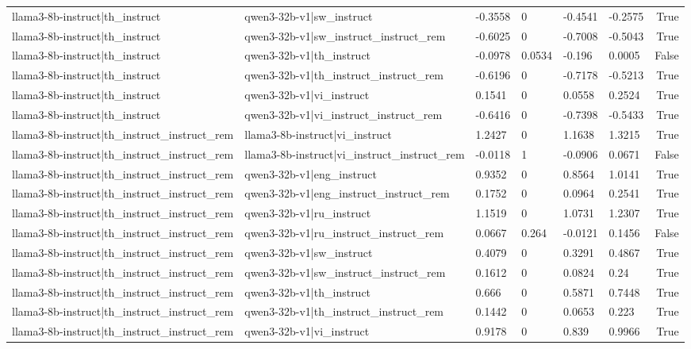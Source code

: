 \begin{table}
\begin{tabular}{llllllr}
llama3-8b-instruct|th_instruct & qwen3-32b-v1|sw_instruct & -0.3558 & 0 & -0.4541 & -0.2575 & True \\
llama3-8b-instruct|th_instruct & qwen3-32b-v1|sw_instruct_instruct_rem & -0.6025 & 0 & -0.7008 & -0.5043 & True \\
llama3-8b-instruct|th_instruct & qwen3-32b-v1|th_instruct & -0.0978 & 0.0534 & -0.196 & 0.0005 & False \\
llama3-8b-instruct|th_instruct & qwen3-32b-v1|th_instruct_instruct_rem & -0.6196 & 0 & -0.7178 & -0.5213 & True \\
llama3-8b-instruct|th_instruct & qwen3-32b-v1|vi_instruct & 0.1541 & 0 & 0.0558 & 0.2524 & True \\
llama3-8b-instruct|th_instruct & qwen3-32b-v1|vi_instruct_instruct_rem & -0.6416 & 0 & -0.7398 & -0.5433 & True \\
llama3-8b-instruct|th_instruct_instruct_rem & llama3-8b-instruct|vi_instruct & 1.2427 & 0 & 1.1638 & 1.3215 & True \\
llama3-8b-instruct|th_instruct_instruct_rem & llama3-8b-instruct|vi_instruct_instruct_rem & -0.0118 & 1 & -0.0906 & 0.0671 & False \\
llama3-8b-instruct|th_instruct_instruct_rem & qwen3-32b-v1|eng_instruct & 0.9352 & 0 & 0.8564 & 1.0141 & True \\
llama3-8b-instruct|th_instruct_instruct_rem & qwen3-32b-v1|eng_instruct_instruct_rem & 0.1752 & 0 & 0.0964 & 0.2541 & True \\
llama3-8b-instruct|th_instruct_instruct_rem & qwen3-32b-v1|ru_instruct & 1.1519 & 0 & 1.0731 & 1.2307 & True \\
llama3-8b-instruct|th_instruct_instruct_rem & qwen3-32b-v1|ru_instruct_instruct_rem & 0.0667 & 0.264 & -0.0121 & 0.1456 & False \\
llama3-8b-instruct|th_instruct_instruct_rem & qwen3-32b-v1|sw_instruct & 0.4079 & 0 & 0.3291 & 0.4867 & True \\
llama3-8b-instruct|th_instruct_instruct_rem & qwen3-32b-v1|sw_instruct_instruct_rem & 0.1612 & 0 & 0.0824 & 0.24 & True \\
llama3-8b-instruct|th_instruct_instruct_rem & qwen3-32b-v1|th_instruct & 0.666 & 0 & 0.5871 & 0.7448 & True \\
llama3-8b-instruct|th_instruct_instruct_rem & qwen3-32b-v1|th_instruct_instruct_rem & 0.1442 & 0 & 0.0653 & 0.223 & True \\
llama3-8b-instruct|th_instruct_instruct_rem & qwen3-32b-v1|vi_instruct & 0.9178 & 0 & 0.839 & 0.9966 & True \\

\end{tabular}
\end{table}
